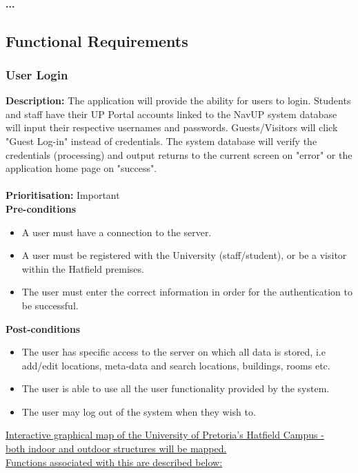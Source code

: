 \documentclass[runningheads,a4paper]{article}
\begin{document}
\paragraph{...}

\subsection{Functional Requirements}

\subsubsection{User Login}
\textbf{Description:}  The application will provide the ability for users to login. Students and staff have their UP Portal accounts linked to the NavUP system database will input their respective usernames and passwords. Guests/Visitors will click "Guest Log-in" instead of credentials. The system database will verify the credentials (processing) and output returns to the current screen on "error" or the application home page on "success".\\\\
\noindent
\textbf{Prioritisation:} Important\\
  
  
\textbf{Pre-conditions}
\begin{itemize}
 	\item A user must have a connection to the server.
  	\item A user must be registered with the University (staff/student), or be a visitor within the Hatfield premises.
  	\item The user must enter the correct information in order for the authentication to be successful.
\end{itemize}
  
\textbf{Post-conditions}
\begin{itemize}
  	\item The user has specific access to the server on which all data is stored, i.e add/edit locations, meta-data and search locations, buildings, rooms etc.
  	\item The user is able to use all the user functionality provided by the system. 
  	\item The user may log out of the system when they wish to.
\end{itemize}

\noindent \underline{Interactive graphical map of the University of Pretoria's Hatfield Campus - }\\
\noindent \underline{both indoor and outdoor structures will be mapped.}\\
\noindent \underline{Functions associated with this are described below:}
\end{document}
